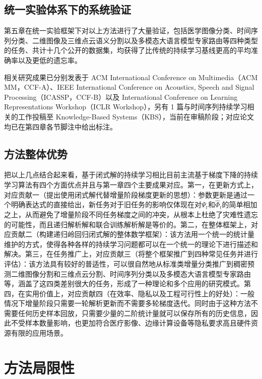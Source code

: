 \subsection{统一实验体系下的系统验证}

第五章在统一实验框架下对以上方法进行了大量验证，包括医学图像分类、时间序列分类、二维图像及三维点云语义分割以及多模态大语言模型专家路由等四种类型的任务、共计十几个公开的数据集，均获得了比传统的持续学习基线更高的平均准确率以及更低的遗忘率。

相关研究成果已分别发表于 ACM International Conference on Multimedia（ACM MM，CCF-A）、IEEE International Conference on Acoustics, Speech and Signal Processing（ICASSP，CCF-B）以及 International Conference on Learning Representations Workshop（ICLR Workshop），另有 1 篇与时间序列持续学习相关的工作投稿至 Knowledge-Based Systems（KBS），当前在审稿阶段；对应论文均已在第四章各节脚注中给出标注。

\subsection{方法整体优势}

把以上几点结合起来看，基于闭式解的持续学习相比目前主流基于梯度下降的持续学习算法有四个方面优点并且与第一章四个主要成果对应。第一，在更新方式上，对应贡献一（提出使用闭式解代替增量阶段梯度更新的思想）：参数更新是通过一个明确表达式的直接给出，新任务对于旧任务的影响仅体现在对$\Psi_t$和$\widehat{\Phi}_t$的简单相加之上，从而避免了增量阶段不同任务梯度之间的冲突，从根本上杜绝了灾难性遗忘的可能性，而且递归解析解和联合训练解析解是等价的。第二，在整体框架上，对应贡献二（构建递归岭回归闭式解的整体数学框架）：该方法用一个统一的统计量维护的方式，使得各种各样的持续学习问题都可以在一个统一的理论下进行描述和解决。第三，在任务推广上，对应贡献三（将整个框架推广到四种常见任务并进行评估）：该方法具有较好的普适性，可以很自然地从标准类增量分类推广到稠密预测二维图像分割和三维点云分割、时间序列分类以及多模态大语言模型专家路由等，涵盖了这四类差别很大的任务，形成了一种理论和多个应用的研究模式。第四，在实用价值上，对应贡献四（在效率、隐私以及工程可行性上的好处）：一般情况下增量阶段只需要一轮解析更新而不需要多轮梯度迭代。同时由于这种方法不需要任何历史样本回放，只需要少量的二阶统计量就可以保存所有的历史信息，因此不受样本数量影响，也更加符合医疗影像、边缘计算设备等隐私要求高且硬件资源有限的应用场景。

\section{方法局限性}


